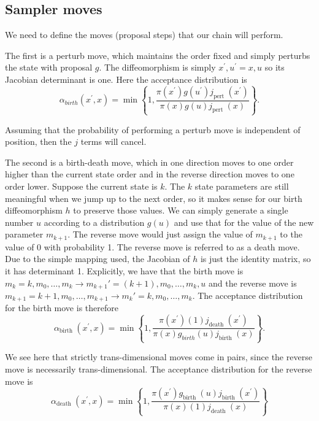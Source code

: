 \documentclass[11pt]{article}
\begin{document}
\subsection{Sampler moves}

We need to define the moves (proposal steps) that our chain will perform.

The first is a perturb move, which maintains the order fixed and simply perturbs the state with proposal $g$. The diffeomorphism is simply $x^{\prime}, u^{\prime}=x, u$ so its Jacobian determinant is one. Here the acceptance distribution is
\begin{equation}
\alpha_{b i r t h}\left(x^{\prime}, x\right)=\min \left\{1, \frac{\pi\left(x^{\prime}\right) g\left(u^{\prime}\right) j_{\text {pert }}\left(x^{\prime}\right)}{\pi(x) g(u) j_{\text {pert }}(x)}\right\}
. \end{equation}

Assuming that the probability of performing a perturb move is independent of position, then the $j$ terms will cancel.

The second is a birth-death move, which in one direction moves to one order higher than the current state order and in the reverse direction moves to one order lower. Suppose the current state is $k$. The $k$ state parameters are still meaningful when we jump up to the next order, so it makes sense for our birth diffeomorphism $h$ to preserve those values. We can simply generate a single number $u$ according to a distribution $g(u)$ and use that for the value of the new parameter $m_{k+1}$. The reverse move would just assign the value of $m_{k+1}$ to the value of $0$ with probability 1. The reverse move is referred to as a death move. Due to the simple mapping used, the Jacobian of $h$ is just the identity matrix, so it has determinant 1. Explicitly, we have that the birth move is $ m_k = k, m_0, \dots, m_{k} \to m_{k+1}' = (k+1), m_0, \dots, m_k, u$ and the reverse move is $ m_{k+1} = k+1, m_0, \dots, m_{k+1} \to m_k' = k, m_0, \dots, m_k$. 
 The acceptance distribution for the birth move is therefore
\begin{equation}
\alpha_{\text {birth }}\left(x^{\prime}, x\right)=\min \left\{1, \frac{\pi\left(x^{\prime}\right)(1) j_{\text {death }}\left(x^{\prime}\right)}{\pi(x) g_{b i r t h}(u) j_{\text {birth }}(x)}\right\}
. \end{equation}

We see here that strictly trans-dimensional moves come in pairs, since the reverse move is necessarily trans-dimensional. The acceptance distribution for the reverse move is
\begin{equation}
\alpha_{\text {death }}\left(x^{\prime}, x\right)=\min \left\{1, \frac{\pi\left(x^{\prime}\right) g_{\text {birth }}(u) j_{\text {birth }}\left(x^{\prime}\right)}{\pi(x)(1) j_{\text {death }}(x)}\right\}
\end{equation}
\end{document}
